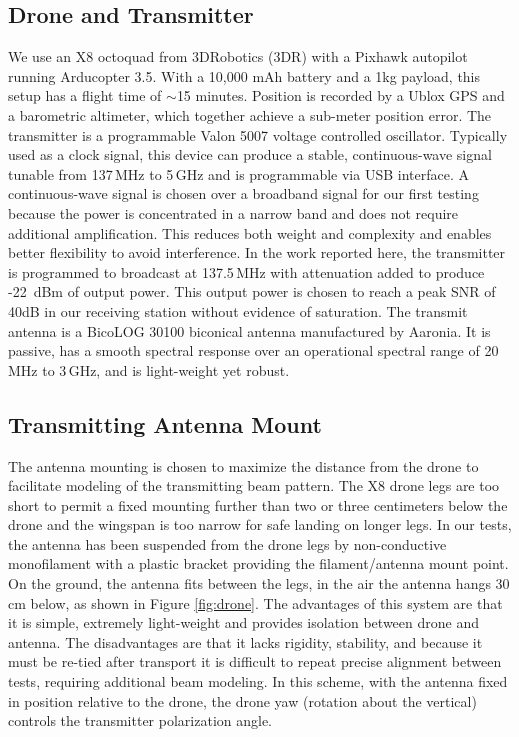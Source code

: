 \documentclass[preprint2,numberedappendix,tighten,twocolappendix]{aastex6}
\begin{document}
\subsection{Drone and Transmitter}
We use an X8 octoquad from 3DRobotics (3DR) with a Pixhawk autopilot running Arducopter 3.5.  With a 10,000 mAh battery and a 1kg payload, this setup has a flight time of $\sim$15 minutes. Position is recorded by a Ublox GPS and a barometric altimeter, which together achieve a sub-meter position error.  The transmitter is a programmable Valon 5007 voltage controlled oscillator. Typically used as a clock signal, this device can produce a stable, continuous-wave signal tunable from 137\,MHz to 5\,GHz and is programmable via USB interface.  A continuous-wave signal is chosen over a broadband signal for our first testing because the power is concentrated in a narrow band and does not require additional amplification. This reduces both weight and complexity and enables better flexibility to avoid interference.  In the work reported here, the transmitter is programmed to broadcast at 137.5\,MHz with attenuation added to produce -22~dBm of output power.  This output power is chosen to reach a peak SNR of 40dB in our receiving station without evidence of saturation.  The transmit antenna is a BicoLOG 30100 biconical antenna manufactured by Aaronia. It is passive, has a smooth spectral response over an operational spectral range of 20\,MHz to 3\,GHz, and is light-weight yet robust. 


\subsection{Transmitting Antenna Mount}

The antenna mounting is chosen to maximize the distance from the drone to facilitate modeling of the transmitting beam pattern. The X8 drone legs are too short to permit a fixed mounting further than two or three centimeters below the drone and the wingspan is too narrow for safe landing on longer legs. In our tests, the antenna has been suspended from the drone legs by non-conductive monofilament with a plastic bracket providing the filament/antenna mount point. On the ground, the antenna fits between the legs, in the air the antenna hangs 30\,cm below, as shown in Figure \ref{fig:drone}. The advantages of this system are that it is simple, extremely light-weight and provides isolation between drone and antenna. The disadvantages are that it lacks rigidity, stability, and because it must be re-tied after transport it is difficult to repeat precise alignment between tests, requiring additional beam modeling.  In this scheme, with the antenna fixed in position relative to the drone, the drone yaw (rotation about the vertical) controls the transmitter polarization angle. 
\end{document}
